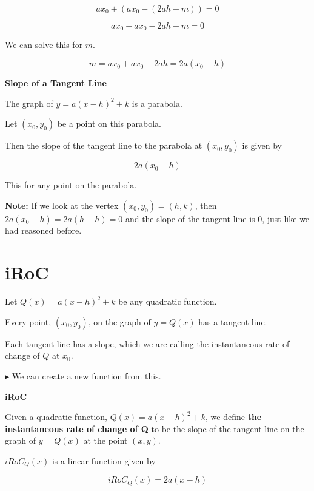 \documentclass{ximera}
\begin{document}
\[
a x_0 + (a x_0 - (2 a h + m)) = 0
\]


\[
a x_0 + a x_0 - 2 a h - m = 0
\] 


We can solve this for $m$.



\[
m = a x_0 + a x_0 - 2 a h = 2 a (x_0 - h)
\] 



\begin{conclusion} \textbf{\textcolor{green!50!black}{Slope of a Tangent Line}} 


The graph of $y = a (x - h)^2 + k$ is a parabola.

Let $(x_0, y_0)$ be a point on this parabola.

Then the slope of the tangent line to the parabola at $(x_0, y_0)$ is given by 



\[ 2 a (x_0 - h) \]


\end{conclusion}
This for any point on the parabola.


\textbf{Note:} If we look at the vertex $(x_0, y_0) = (h, k)$, then $2 a (x_0 - h) = 2 a (h - h) = 0$ and the slope of the tangent line is $0$, just like we had reasoned before.





\section{iRoC}

Let $Q(x) = a (x - h)^2 + k$ be any quadratic function.

Every point, $(x_0, y_0)$, on the graph of $y = Q(x)$ has a tangent line.

Each tangent line has a slope, which we are calling the instantaneous rate of change of $Q$ at $x_0$.


\textbf{\textcolor{red!90!darkgray}{$\blacktriangleright$}} We can create a new function from this.



\begin{definition} \textbf{\textcolor{green!50!black}{iRoC}}  


Given a quadratic function, $Q(x) = a (x - h)^2 + k$, we define \textbf{the instantaneous rate of change of Q} to be the slope of the tangent line on the graph of $y = Q(x)$ at the point $(x, y)$.

$iRoC_Q(x)$ is a linear function given by 

\[  iRoC_Q(x) = 2 a (x-h) \]

\end{definition}
\end{document}
